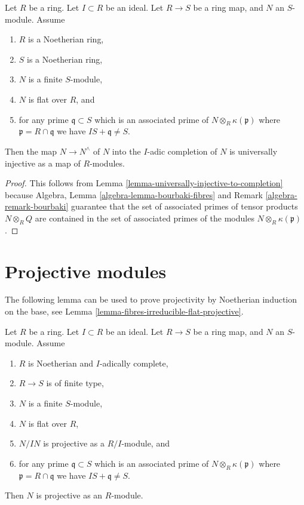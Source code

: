 \begin{lemma}
\label{lemma-universally-injective-to-completion-flat}
Let $R$ be a ring.
Let $I \subset R$ be an ideal.
Let $R \to S$ be a ring map, and $N$ an $S$-module.
Assume
\begin{enumerate}
\item $R$ is a Noetherian ring,
\item $S$ is a Noetherian ring,
\item $N$ is a finite $S$-module,
\item $N$ is flat over $R$, and
\item for any prime $\mathfrak q \subset S$ which is an associated prime of
$N \otimes_R \kappa(\mathfrak p)$ where $\mathfrak p = R \cap \mathfrak q$
we have $IS + \mathfrak q \not = S$.
\end{enumerate}
Then the map $N \to N^\wedge$ of $N$ into the $I$-adic completion of $N$
is universally injective as a map of $R$-modules.
\end{lemma}

\begin{proof}
This follows from
Lemma \ref{lemma-universally-injective-to-completion}
because
Algebra, Lemma
\ref{algebra-lemma-bourbaki-fibres} and
Remark \ref{algebra-remark-bourbaki}
guarantee that the set of associated primes of tensor products
$N \otimes_R Q$ are contained in the set of associated primes of
the modules $N \otimes_R \kappa(\mathfrak p)$.
\end{proof}




\section{Projective modules}
\label{section-projective}

\noindent
The following lemma can be used to prove projectivity by
Noetherian induction on the base, see
Lemma \ref{lemma-fibres-irreducible-flat-projective}.

\begin{lemma}
\label{lemma-flat-pure-over-complete-projective}
Let $R$ be a ring.
Let $I \subset R$ be an ideal.
Let $R \to S$ be a ring map, and $N$ an $S$-module.
Assume
\begin{enumerate}
\item $R$ is Noetherian and $I$-adically complete,
\item $R \to S$ is of finite type,
\item $N$ is a finite $S$-module,
\item $N$ is flat over $R$,
\item $N/IN$ is projective as a $R/I$-module, and
\item for any prime $\mathfrak q \subset S$ which is an associated prime of
$N \otimes_R \kappa(\mathfrak p)$ where $\mathfrak p = R \cap \mathfrak q$
we have $IS + \mathfrak q \not = S$.
\end{enumerate}
Then $N$ is projective as an $R$-module.
\end{lemma}

